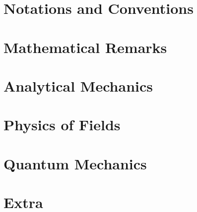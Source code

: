 % 


\chapter{Notations and Conventions}



\chapter{Mathematical Remarks}



\chapter{Analytical Mechanics}






\chapter{Physics of Fields}





\chapter{Quantum Mechanics}




\chapter{Extra}
% 







\renewcommand{\emph}[1]{\textit{#1}}
\printbibliography



